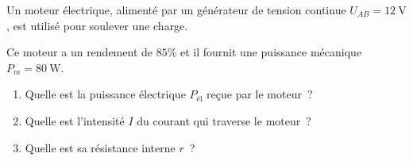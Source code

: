 Un moteur électrique, alimenté par un générateur de tension continue
$U_{AB}=\qty{12}{\volt}$, est utilisé pour soulever une charge.

Ce moteur a un rendement de $85\%$ et il fournit une puissance mécanique
$P_{m}=\qty{80}{\watt}$.
\begin{enumerate}
    \item Quelle est la puissance électrique $P_{\text{él}}$ reçue par le
          moteur~?
    \item Quelle est l'intensité $I$ du courant qui traverse le moteur~?
    \item Quelle est sa résistance interne $r$~?
\end{enumerate}

